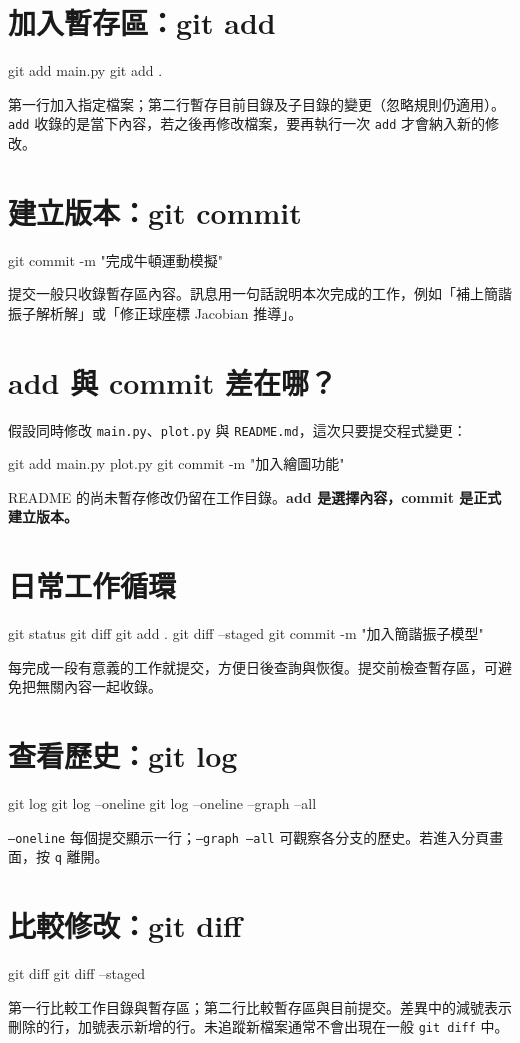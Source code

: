 \documentclass[UTF8,fontset=fandol,11pt,a4paper]{ctexart}
\begin{document}
\section{加入暫存區：git add}
\begin{code}
    git add main.py
    git add .
\end{code}
第一行加入指定檔案；第二行暫存目前目錄及子目錄的變更（忽略規則仍適用）。\texttt{add} 收錄的是當下內容，若之後再修改檔案，要再執行一次 \texttt{add} 才會納入新的修改。
\section{建立版本：git commit}
\begin{code}
    git commit -m "完成牛頓運動模擬"
\end{code}
提交一般只收錄暫存區內容。訊息用一句話說明本次完成的工作，例如「補上簡諧振子解析解」或「修正球座標 Jacobian 推導」。
\section{add 與 commit 差在哪？}
假設同時修改 \texttt{main.py}、\texttt{plot.py} 與 \texttt{README.md}，這次只要提交程式變更：
\begin{code}
    git add main.py plot.py
    git commit -m "加入繪圖功能"
\end{code}
README 的尚未暫存修改仍留在工作目錄。\textbf{add 是選擇內容，commit 是正式建立版本。}
\section{日常工作循環}
\begin{code}
    git status
    git diff
    git add .
    git diff --staged
    git commit -m "加入簡諧振子模型"
\end{code}
每完成一段有意義的工作就提交，方便日後查詢與恢復。提交前檢查暫存區，可避免把無關內容一起收錄。
\section{查看歷史：git log}
\begin{code}
    git log
    git log --oneline
    git log --oneline --graph --all
\end{code}
\texttt{--oneline} 每個提交顯示一行；\texttt{--graph --all} 可觀察各分支的歷史。若進入分頁畫面，按 \texttt{q} 離開。
\section{比較修改：git diff}
\begin{code}
    git diff
    git diff --staged
\end{code}
第一行比較工作目錄與暫存區；第二行比較暫存區與目前提交。差異中的減號表示刪除的行，加號表示新增的行。未追蹤新檔案通常不會出現在一般 \texttt{git diff} 中。
\end{document}
